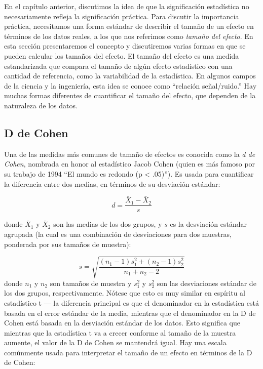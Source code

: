 \documentclass[
  12pt,
]{book}
\begin{document}
En el capítulo anterior, discutimos la idea de que la significación estadística no necesariamente refleja la significación práctica. Para discutir la importancia práctica, necesitamos una forma estándar de describir el tamaño de un efecto en términos de los datos reales, a los que nos referimos como \emph{tamaño del efecto}. En esta sección presentaremos el concepto y discutiremos varias formas en que se pueden calcular los tamaños del efecto.
El tamaño del efecto es una medida estandarizada que compara el tamaño de algún efecto estadístico con una cantidad de referencia, como la variabilidad de la estadística. En algunos campos de la ciencia y la ingeniería, esta idea se conoce como ``relación señal/ruido.'' Hay muchas formas diferentes de cuantificar el tamaño del efecto, que dependen de la naturaleza de los datos.

\hypertarget{d-de-cohen}{%
\subsection{D de Cohen}\label{d-de-cohen}}

Una de las medidas más comunes de tamaño de efectos es conocida como la \emph{d de Cohen}, nombrada en honor al estadístico Jacob Cohen (quien es más famoso por su trabajo de 1994 ``El mundo es redondo (p \textless{} .05)''). Es usada para cuantificar la diferencia entre dos medias, en términos de su desviación estándar:

\[
d = \frac{\bar{X}_1 - \bar{X}_2}{s}
\]

donde \(\bar{X}_1\) y \(\bar{X}_2\) son las medias de los dos grupos, y \(s\) es la desviación estándar agrupada (la cual es una combinación de desviaciones para dos muestras, ponderada por sus tamaños de muestra):

\[
s = \sqrt{\frac{(n_1 - 1)s^2_1 + (n_2 - 1)s^2_2 }{n_1 +n_2 -2}}
\]
donde \(n_1\) y \(n_2\) son tamaños de muestra y \(s^2_1\) y \(s^2_2\) son las desviaciones estándar de los dos grupos, respectivamente. Nótese que esto es muy similar en espíritu al estadístico t --- la diferencia principal es que el denominador en la estadística está basada en el error estándar de la media, mientras que el denominador en la D de Cohen está basada en la desviación estándar de los datos. Esto significa que mientras que la estadística t va a crecer conforme al tamaño de la muestra aumente, el valor de la D de Cohen se mantendrá igual.
Hay una escala comúnmente usada para interpretar el tamaño de un efecto en términos de la D de Cohen:
\end{document}
